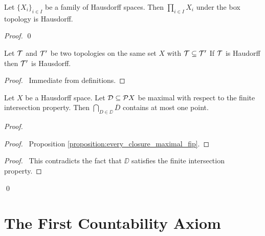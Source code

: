 \begin{proposition}
    Let $\{ X_i \}_{i \in I}$ be a family of Hausdorff spaces. Then $\prod_{i \in I} X_i$ under the box topology is Hausdorff.
\end{proposition}

\begin{proof}
    \pf
    \qed
\end{proof}

\begin{proposition}
    \label{proposition:Hausdorff_finer}
    Let $\mathcal{T}$ and $\mathcal{T}'$ be two topologies on the same set $X$ with $\mathcal{T} \subseteq \mathcal{T}'$
    If $\mathcal{T}$ is Haudorff then $\mathcal{T}'$ is Hausdorff.
\end{proposition}

\begin{proof}
    \pf\ Immediate from definitions.
\end{proof}

\begin{proposition}
    Let $X$ be a Hausdorff space. Let $\mathcal{D} \subseteq \mathcal{P} X$ be maximal
    with respect to the finite intersection property. Then $\bigcap_{D \in \DD}
    \overline{D}$ contains at most one point.
\end{proposition}

\begin{proof}
    \pf
    \begin{proof}
        \pf\ Proposition \ref{proposition:every_closure_maximal_fip}.
    \end{proof}
    \qedstep
    \begin{proof}
        \pf\ This contradicts the fact that $\DD$ satisfies the finite intersection property.
    \end{proof}
    \qed
\end{proof}

\section{The First Countability Axiom}

